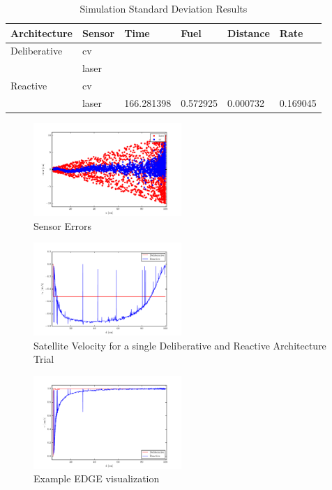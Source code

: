 \documentclass[journal, 10pt]{IEEEtran}
\begin{document}
\vspace{5mm}

\begin{table}
\centering
\normalsize
\caption{Simulation Standard Deviation Results}
\begin{tabular}{llllll}
\toprule
Architecture & Sensor & Time & Fuel & Distance & Rate \\
\midrule
Deliberative & cv \\
			& laser \\
Reactive & cv \\
& laser &  166.281398 &   0.572925 &  0.000732 &  0.169045 \\

\bottomrule
\end{tabular}
\label{std_dev}
\end{table}
 
\begin{figure}[tb]
\begin{center}
\includegraphics[width=0.5\textwidth]{figures/error.pdf}
\caption{Sensor Errors}
\label{error}
\end{center}
\end{figure}

\begin{figure}[tb]
\begin{center}
\includegraphics[width=0.5\textwidth]{figures/velocity.pdf}
\caption{Satellite Velocity for a single Deliberative and Reactive Architecture Trial}
\label{velocity}
\end{center}
\end{figure}

\begin{figure}[tb]
\begin{center}
\includegraphics[width=0.5\textwidth]{figures/v_total.pdf}
\caption{Example EDGE visualization}
\label{v_total}
\end{center}
\end{figure}
\end{document}
